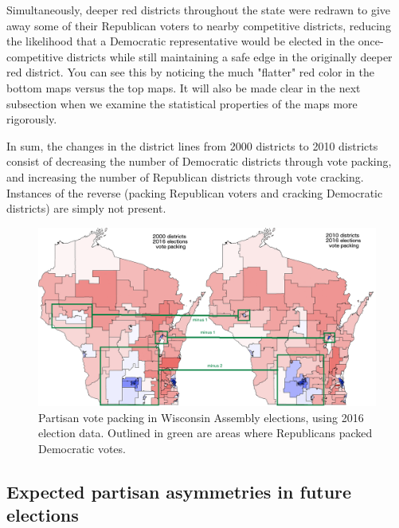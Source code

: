 \documentclass[preprint,12pt]{article}
\begin{document}
Simultaneously, deeper red districts throughout the state were redrawn to give away some of their Republican voters to nearby competitive districts, reducing the likelihood that a Democratic representative would be elected in the once-competitive districts while still maintaining a safe edge in the originally deeper red district.  
You can see this by noticing the much "flatter" red color in the bottom maps versus the top maps.
It will also be made clear in the next subsection when we examine the statistical properties of the maps more rigorously.

In sum, the changes in the district lines from 2000 districts to 2010 districts consist of decreasing the number of Democratic districts through vote packing, and increasing the number of Republican districts through vote cracking.
Instances of the reverse (packing Republican voters and cracking Democratic districts) are simply not present.
\begin{figure}[htb!]
    \begin{center}
        \includegraphics[scale=0.40]{../Figures/WI_compared/districts_compared_deltas.png}
        \caption{Partisan vote packing in Wisconsin Assembly elections, using 2016 election data.  Outlined in green are areas where Republicans packed Democratic votes.}\label{fig:DistrictMapDelta}
    \end{center}
\end{figure}



\subsection{Expected  partisan asymmetries in future elections}
\end{document}
